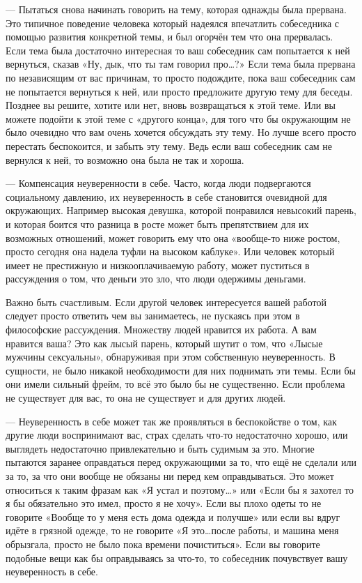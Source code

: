 --- Пытаться снова начинать говорить на тему, которая однажды была прервана. Это типичное поведение человека который надеялся впечатлить собеседника с помощью развития конкретной темы, и был огорчён тем что она прервалась. Если тема была достаточно интересная то ваш собеседник сам попытается к ней вернуться, сказав «Ну, дык, что ты там говорил про\ldots?» Если тема была прервана по независящим от вас причинам, то просто подождите, пока ваш собеседник сам не попытается вернуться к ней, или просто предложите другую тему для беседы. Позднее вы решите, хотите или нет, вновь возвращаться к этой теме. Или вы можете подойти к этой теме с «другого конца», для того что бы окружающим не было очевидно что вам очень хочется обсуждать эту тему. Но лучше всего просто перестать беспокоится, и забыть эту тему. Ведь если ваш собеседник сам не вернулся к ней, то возможно она была не так и хороша.

--- Компенсация неуверенности в себе. Часто, когда люди подвергаются социальному давлению, их неуверенность в себе становится очевидной для окружающих. Например высокая девушка, которой понравился невысокий парень, и которая боится что разница в росте может быть препятствием для их возможных отношений, может говорить ему что она «вообще-то ниже ростом, просто сегодня она надела туфли на высоком каблуке». Или человек который имеет не престижную и низкооплачиваемую работу, может пуститься в рассуждения о том, что деньги это зло, что люди одержимы деньгами.

Важно быть счастливым. Если другой человек интересуется вашей работой следует просто ответить чем вы занимаетесь, не пускаясь при этом в философские рассуждения. Множеству людей нравится их работа. А вам нравится ваша? Это как лысый парень, который шутит о том, что «Лысые мужчины сексуальны», обнаруживая при этом собственную неуверенность. В сущности, не было никакой необходимости для них поднимать эти темы. Если бы они имели сильный фрейм, то всё это было бы не существенно. Если проблема не существует для вас, то она не существует и для других людей.

--- Неуверенность в себе может так же проявляться в беспокойстве о том, как другие люди воспринимают вас, страх сделать что-то недостаточно хорошо, или выглядеть недостаточно привлекательно и быть судимым за это. Многие пытаются заранее оправдаться перед окружающими за то, что ещё не сделали или за то, за что они вообще не обязаны ни перед кем оправдываться. Это может относиться к таким фразам как «Я устал и поэтому\ldots» или «Если бы я захотел то я бы обязательно это имел, просто я не хочу». Если вы плохо одеты то не говорите «Вообще то у меня есть дома одежда и получше» или если вы вдруг идёте в грязной одежде, то не говорите «Я это\ldots после работы, и машина меня обрызгала, просто не было пока времени почиститься». Если вы говорите подобные вещи как бы оправдываясь за что-то, то собеседник почувствует вашу неуверенность в себе.

